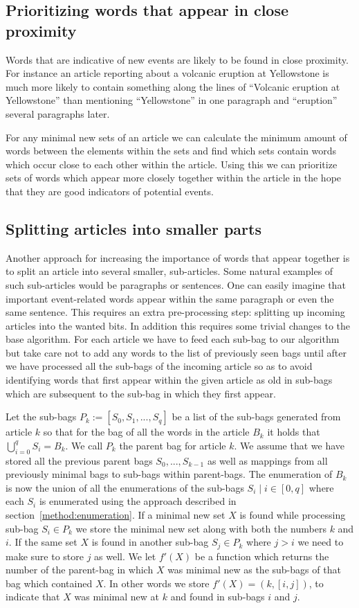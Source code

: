 \subsection{Prioritizing words that appear in close proximity}
Words that are indicative of new events are likely to be found in close proximity. For instance an article reporting about a volcanic eruption at Yellowstone is much more likely to contain something along the lines of ``Volcanic eruption at Yellowstone'' than mentioning ``Yellowstone'' in one paragraph and ``eruption'' several paragraphs later.

For any minimal new sets of an article we can calculate the minimum amount of words between the elements within the sets and find which sets contain words which occur close to each other within the article. Using this we can prioritize sets of words which appear more closely together within the article in the hope that they are good indicators of potential events.

\subsection{Splitting articles into smaller parts}
Another approach for increasing the importance of words that appear together is to split an article into several smaller, sub-articles. Some natural examples of such sub-articles would be paragraphs or sentences. One can easily imagine that important event-related words appear within the same paragraph or even the same sentence. This requires an extra pre-processing step: splitting up incoming articles into the wanted bits. In addition this requires some trivial changes to the base algorithm. For each article we have to feed each sub-bag to our algorithm but take care not to add any words to the list of previously seen bags until after we have processed all the sub-bags of the incoming article so as to avoid identifying words that first appear within the given article as old in sub-bags which are subsequent to the sub-bag in which they first appear.

Let the sub-bags $P_{k} := [S_{0}, S_{1},...,S_{q}]$ be a list of the sub-bags generated from article $k$ so that for the bag of all the words in the article $B_{k}$ it holds that $\bigcup_{i=0}^{q}S_{i} = B_{k}$. We call $P_{k}$ the parent bag for article $k$. We assume that we have stored all the previous parent bags $S_{0},...,S_{k-1}$ as well as mappings from all previously minimal bags to sub-bags within parent-bags. The enumeration of $B_{k}$ is now the union of all the enumerations of the sub-bags $S_{i} \mid i \in [0,q]$ where each $S_{i}$ is enumerated using the approach described in section~\ref{method:enumeration}. If a minimal new set $X$ is found while processing sub-bag $S_{i} \in P_{k}$ we store the minimal new set along with both the numbers $k$ and $i$. If the same set $X$ is found in another sub-bag $S_{j} \in P_{k}$ where $j>i$ we need to make sure to store $j$ as well. We let $f'(X)$ be a function which returns the number of the  parent-bag in which $X$ was minimal new as the sub-bags of that bag which contained $X$. In other words we store $f'(X) = (k, [i,j])$, to indicate that $X$ was minimal new at $k$ and found in sub-bags $i$ and $j$. 

